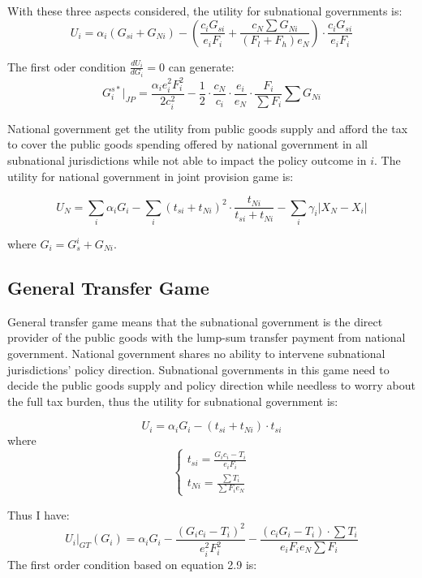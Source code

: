 \begin{itemize}
With these three aspects considered, the utility for subnational governments is:
$$U_i=\alpha_i (G_{si}+G_{Ni})-\left(\frac{c_i G_{si}}{e_i F_i}+ \frac{c_N \sum G_{Ni}}{(F_l+F_h) e_N}\right) \cdot \frac{c_i G_{si}}{e_i F_i} $$

The first oder condition $\frac{dU_i}{dG_i}=0$ can generate:
\begin{equation}
    G_{i}^{s*}|_{JP}=\frac{\alpha_ie_i^2F_i^2}{2c_i^2}-\frac{1}{2}\cdot\frac{c_N}{c_i}\cdot\frac{e_i}{e_N}\cdot\frac{F_i}{\sum F_i}\sum G_{Ni}
\end{equation}

National government get the utility from public goods supply and afford the tax to cover the public goods spending offered by national government in all subnational jurisdictions while not able to impact the policy outcome in $i$. The utility for national government in joint provision game is:

\begin{equation}
    U_N= \sum_i \alpha_i G_i - \sum_i (t_{si}+t_{Ni})^2 \cdot \frac{t_{Ni}}{t_{si}+t_{Ni}}
    -\sum_i \gamma_i |X_N-X_i|
\end{equation}

where $G_i=G_{s}^i+G_{Ni}$.

\subsection{General Transfer Game}
General transfer game means that the subnational government is the direct provider of the public goods with the lump-sum transfer payment from national government. National government shares no ability to intervene subnational jurisdictions' policy direction. Subnational governments in this game need to decide the public goods supply and policy direction while needless to worry about the full tax burden, thus the utility for subnational government is:

$$U_i=\alpha_i G_i -(t_{si}+t_{Ni})\cdot t_{si}$$
where
$$
    \left\{\begin{array}{l}
        t_{si}= \frac{G_i c_i-T_i}{e_i F_i} \\
        t_{Ni}=\frac{\sum T_i}{\sum F_i e_N}
    \end{array}\right.
$$

Thus I have:
\begin{equation}
    U_i|_{GT}(G_i)=\alpha_i G_i- \frac{(G_i c_i-T_i)^2}{e_i^2 F_i^2}-\frac{(c_iG_i-T_i)\cdot \sum T_i}{e_i F_i e_N\sum F_i }
\end{equation}
The first order condition based on equation 2.9 is:


\end{itemize}
